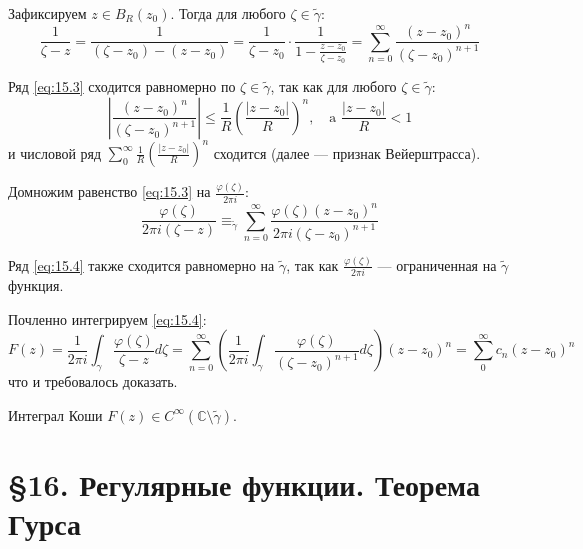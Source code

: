 \begin{tproof}
    Зафиксируем $z \in B_R(z_0)$. Тогда для любого $\zeta \in \tilde{\gamma}$:
    \begin{equation} \label{eq:15.3}
        \frac{1}{\zeta - z} = \frac{1}{(\zeta - z_0) - (z - z_0)} = \frac{1}{\zeta - z_0} \cdot \frac{1}{1 - \frac{z - z_0}{\zeta - z_0}} = \sum_{n=0}^{\infty} \frac{(z - z_0)^n}{(\zeta - z_0)^{n+1}}
    \end{equation}
    
    Ряд \eqref{eq:15.3} сходится равномерно по $\zeta \in \tilde{\gamma}$, так как для любого $\zeta \in \tilde{\gamma}$:
    \[
        \left| \frac{(z - z_0)^n}{(\zeta - z_0)^{n+1}} \right| \le \frac{1}{R} \left( \frac{|z - z_0|}{R} \right)^n, \quad \text{a } \frac{|z - z_0|}{R} < 1
    \]
    и числовой ряд $\sum_{0}^{\infty} \frac{1}{R} \left( \frac{|z - z_0|}{R} \right)^n$ сходится (далее — признак Вейерштрасса).

    Домножим равенство \eqref{eq:15.3} на $\frac{\varphi(\zeta)}{2\pi i}$:
    \begin{equation} \label{eq:15.4}
        \frac{\varphi(\zeta)}{2\pi i (\zeta - z)} \equiv_{\tilde{\gamma}} \sum_{n=0}^{\infty} \frac{\varphi(\zeta) (z - z_0)^n}{2\pi i (\zeta - z_0)^{n+1}}
    \end{equation}
    
    Ряд \eqref{eq:15.4} также сходится равномерно на $\tilde{\gamma}$, так как $\frac{\varphi(\zeta)}{2\pi i}$ — ограниченная на $\tilde{\gamma}$ функция.
    
    Почленно интегрируем \eqref{eq:15.4}:
    \begin{equation} \label{eq:15.5}
        F(z) = \frac{1}{2\pi i} \int_{\gamma} \frac{\varphi(\zeta)}{\zeta - z} d\zeta = \sum_{n=0}^{\infty} \left( \frac{1}{2\pi i} \int_{\gamma} \frac{\varphi(\zeta)}{(\zeta - z_0)^{n+1}} d\zeta \right) (z - z_0)^n = \sum_{0}^{\infty} c_n (z - z_0)^n
    \end{equation}
    что и требовалось доказать.
\end{tproof}

\begin{conseq}
    Интеграл Коши $F(z) \in C^{\infty}(\mathbb{C} \setminus \tilde{\gamma})$.
\end{conseq}

\section{§16. Регулярные функции. Теорема Гурса}

